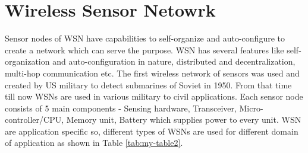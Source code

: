 \section{Wireless Sensor Netowrk}
Sensor nodes of WSN have capabilities to self-organize and auto-configure to create a network which can serve the purpose. WSN has several features like self-organization and auto-configuration in nature, distributed and decentralization, multi-hop communication etc. The first wireless network of sensors was used and created by US military to detect submarines of Soviet in 1950. From that time till now WSNs are used in various military to civil applications. Each sensor node consists of 5 main components - Sensing hardware, Transceiver, Micro-controller/CPU, Memory unit, Battery which supplies power to every unit. WSN are application specific so, different types of WSNs are used for different domain of application \cite{articleTypesWSN} as shown in Table \ref{tab:my-table2}.
\begin{table}[htp]
\centering
\caption{Types of WSN.}
\label{tab:my-table2}
\end{table}

